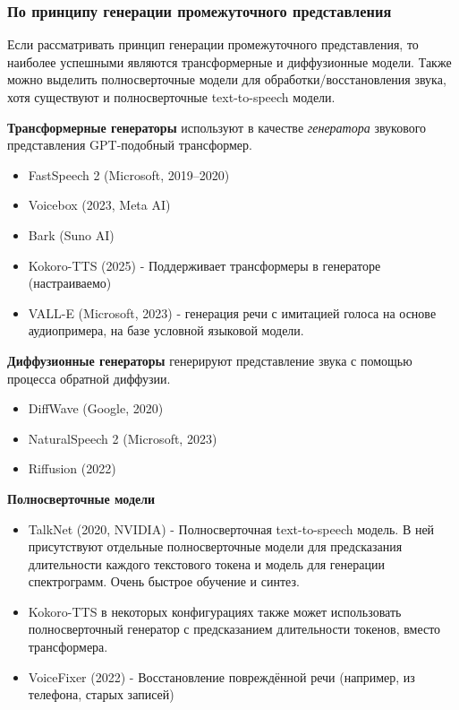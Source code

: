 \subsubsection{По принципу генерации промежуточного представления}
Если рассматривать принцип генерации промежуточного представления, то наиболее успешными являются трансформерные и диффузионные модели.
Также можно выделить полносверточные модели для обработки/восстановления звука, хотя существуют и полносверточные text-to-speech модели.


\textbf{Трансформерные генераторы} используют в качестве \textit{генератора} звукового представления GPT-подобный трансформер.
\begin{itemize}
  \item FastSpeech 2 (Microsoft, 2019–2020) \cite{FastSpeech2}
  \item Voicebox (2023, Meta AI) \cite{le2023voicebox}
  \item Bark (Suno AI) \cite{SunoAI_Bark_2023}
  \item Kokoro-TTS (2025) \cite{kokoro} - Поддерживает трансформеры в генераторе (настраиваемо)
  \item VALL-E (Microsoft, 2023) \cite{Valle} - генерация речи с имитацией голоса на основе аудиопримера, на базе условной языковой модели.
\end{itemize}

\textbf{Диффузионные генераторы} генерируют представление звука с помощью процесса обратной диффузии.
\begin{itemize}
  \item DiffWave (Google, 2020) \cite{DiffWave}
  \item NaturalSpeech 2 (Microsoft, 2023) \cite{NaturalSpeech2}
  \item Riffusion (2022) \cite{Riffusion}
\end{itemize}

\textbf{Полносверточные модели}
\begin{itemize} 
  \item TalkNet (2020, NVIDIA) \cite{TalkNet} - Полносверточная text-to-speech модель. В ней присутствуют отдельные полносверточные модели для предсказания длительности каждого текстового токена и модель для генерации спектрограмм. Очень быстрое обучение и синтез.
  \item Kokoro-TTS \cite{kokoro} в некоторых конфигурациях также может использовать полносверточный генератор с предсказанием длительности токенов, вместо трансформера.
  \item VoiceFixer (2022) \cite{VoiceFixer} - Восстановление повреждённой речи (например, из телефона, старых записей)
\end{itemize}


